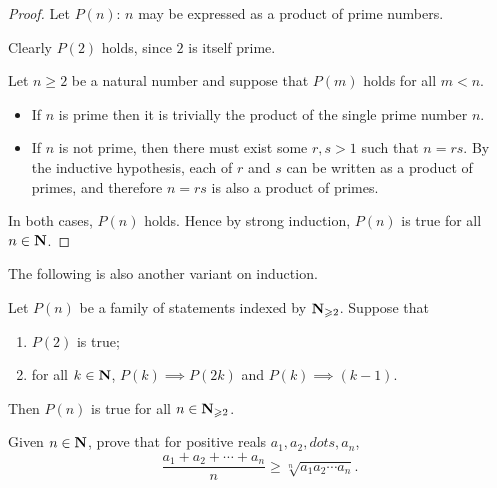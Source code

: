 \begin{proof}
Let $P(n)$: $n$ may be expressed as a product of prime numbers. 

Clearly $P(2)$ holds, since $2$ is itself prime. 

Let $n\ge 2$ be a natural number and suppose that $P(m)$ holds for all $m<n$.

\begin{itemize}
\item If $n$ is prime then it is trivially the product of the single prime number $n$. 

\item If $n$ is not prime, then there must exist some $r, s > 1$ such that $n = rs$. By the inductive hypothesis, each of $r$ and $s$ can be written as a product of primes, and therefore $n = rs$ is also a product of primes.
\end{itemize}

In both cases, $P(n)$ holds. Hence by strong induction, $P(n)$ is true for all $n\in\mathbf N$.
\end{proof}

The following is also another variant on induction.

\begin{theorem}
Let $P(n)$ be a family of statements indexed by $\mathbf N_{\geqslant2}$. Suppose that
\begin{enumerate}[label=(\roman*)]
\item $P(2)$ is true;
\item for all $k\in\mathbf N$, $P(k)\implies P(2k)$ and $P(k)\implies (k-1)$.
\end{enumerate}
Then $P(n)$ is true for all $n\in\mathbf N_{\geqslant2}$.
\end{theorem}

\begin{exercise}[AM--GM inequality]
Given $n\in\mathbf N$, prove that for positive reals $a_1,a_2,dots,a_n$,
\[\frac{a_1+a_2+\cdots+a_n}{n}\ge\sqrt[n]{a_1a_2\cdots a_n}.\]
\end{exercise}

